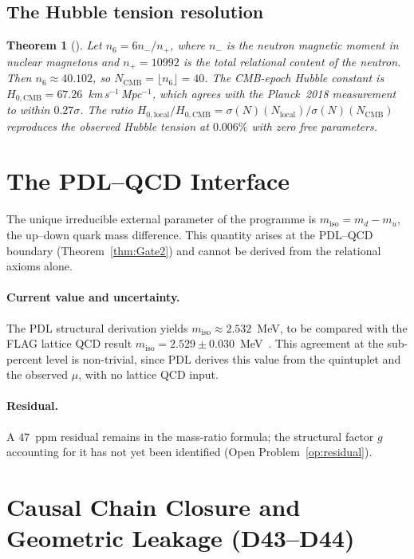 \documentclass[11pt,a4paper]{article}
\theoremstyle{plain}
\newtheorem{theorem}{Theorem}[section]
\theoremstyle{definition}
\theoremstyle{remark}
\newcommand{\sigmaN}{\sigma(N)}
\begin{document}
\subsection{The Hubble tension resolution}
\label{subsec:hubble}
\begin{theorem}[\cite{D27,D35}]
\label{thm:hubble}
Let $n_6=6n_-/n_+$, where $n_-$ is the neutron magnetic moment in nuclear magnetons and $n_{+}=10992$ is the total relational content of the neutron. Then $n_6\approx 40.102$, so $N_{\mathrm{CMB}}=\lfloor n_6\rfloor=40$. The CMB-epoch Hubble constant is $H_{0,\mathrm{CMB}}=67.26$~km\,s$^{-1}$\,Mpc$^{-1}$, which agrees with the Planck~2018 measurement to within $0.27\sigma$. The ratio $H_{0,\mathrm{local}}/H_{0,\mathrm{CMB}}=\sigmaN(N_{\mathrm{local}})/\sigmaN(N_{\mathrm{CMB}})$ reproduces the observed Hubble tension at $0.006\%$ with zero free parameters.
\end{theorem}

\section{The PDL--QCD Interface}
\label{sec:QCD}
The unique irreducible external parameter of the programme is $m_{\mathrm{iso}}=m_d-m_u$, the up--down quark mass difference. This quantity arises at the PDL--QCD boundary (Theorem~\ref{thm:Gate2}) and cannot be derived from the relational axioms alone.

\paragraph{Current value and uncertainty.} The PDL structural derivation yields $m_{\mathrm{iso}}\approx 2.532$~MeV, to be compared with the FLAG lattice QCD result $m_{\mathrm{iso}}=2.529\pm0.030$~MeV~\cite{D30}. This agreement at the sub-percent level is non-trivial, since PDL derives this value from the quintuplet and the observed $\mu$, with no lattice QCD input.

\paragraph{Residual.} A $47$~ppm residual remains in the mass-ratio formula; the structural factor $g$ accounting for it has not yet been identified (Open Problem~\ref{op:residual}).

\section{Causal Chain Closure and Geometric Leakage (D43--D44)}
\label{sec:numerical}
\end{document}
